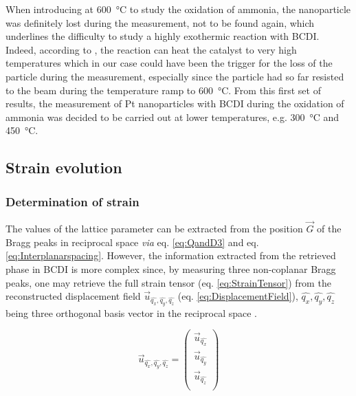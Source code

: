 When introducing \dioxygen at \qty{600}{\degreeCelsius} to study the oxidation of ammonia, the nanoparticle was definitely lost during the measurement, not to be found again, which underlines the difficulty to study a highly exothermic reaction with BCDI.
Indeed, according to \cite{}, the reaction can heat the catalyst to very high temperatures which in our case could have been the trigger for the loss of the particle during the measurement, especially since the particle had so far resisted to the beam during the temperature ramp to \qty{600}{\degreeCelsius}.
From this first set of results, the measurement of Pt nanoparticles with BCDI during the oxidation of ammonia was decided to be carried out at lower temperatures, e.g. \qty{300}{\degreeCelsius} and \qty{450}{\degreeCelsius}.

\subsection{Strain evolution} \label{sec:StrainTempRamp}

\subsubsection{Determination of strain}

The values of the lattice parameter can be extracted from the position $\vec{G}$ of the Bragg peaks in reciprocal space \textit{via} eq. \ref{eq:QandD3} and eq. \ref{eq:Interplanarspacing}.
However, the information extracted from the retrieved phase in BCDI is more complex since, by measuring three non-coplanar Bragg peaks, one may retrieve the full strain tensor (eq. \ref{eq:StrainTensor}) from the reconstructed displacement field $\vec{u}_{\hat{q_x}, \hat{q_y}, \hat{q_z}}$ (eq. \ref{eq:DisplacementField}), $\hat{q_x}, \hat{q_y}, \hat{q_z}$ being three orthogonal basis vector in the reciprocal space \parencite{Karpov2019}.

\begin{equation}
    \vec{u}_{\hat{q_x}, \hat{q_y}, \hat{q_z}} =
     \begin{pmatrix}
        \vec{u}_{\hat{q_x}} \\
        \vec{u}_{\hat{q_y}} \\
        \vec{u}_{\hat{q_z}} \\
     \end{pmatrix}
     \label{eq:DisplacementField}
\end{equation}

